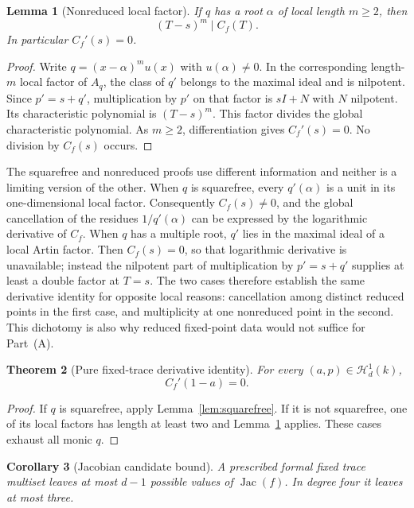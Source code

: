 \documentclass[11pt]{article}
\newtheorem{theorem}{Theorem}[section]
\newtheorem{lemma}[theorem]{Lemma}
\newtheorem{corollary}[theorem]{Corollary}
\theoremstyle{definition}
\newcommand{\Hn}{\mathcal H}
\newcommand{\Jac}{\operatorname{Jac}}
\begin{document}
\begin{lemma}[Nonreduced local factor]
\label{lem:nonreduced}
If $q$ has a root $\alpha$ of local length $m\ge2$, then
\[
(T-s)^m\mid C_f(T).
\]
In particular $C_f'(s)=0$.
\end{lemma}

\begin{proof}
Write $q=(x-\alpha)^m u(x)$ with $u(\alpha)\ne0$. In the corresponding length-$m$ local factor of $A_q$, the class of $q'$ belongs to the maximal ideal and is nilpotent. Since $p'=s+q'$, multiplication by $p'$ on that factor is $sI+N$ with $N$ nilpotent. Its characteristic polynomial is $(T-s)^m$. This factor divides the global characteristic polynomial. As $m\ge2$, differentiation gives $C_f'(s)=0$. No division by $C_f(s)$ occurs.
\end{proof}

The squarefree and nonreduced proofs use different information and neither is a limiting version of the other. When $q$ is squarefree, every $q'(\alpha)$ is a unit in its one-dimensional local factor. Consequently $C_f(s)\ne0$, and the global cancellation of the residues $1/q'(\alpha)$ can be expressed by the logarithmic derivative of $C_f$. When $q$ has a multiple root, $q'$ lies in the maximal ideal of a local Artin factor. Then $C_f(s)=0$, so that logarithmic derivative is unavailable; instead the nilpotent part of multiplication by $p'=s+q'$ supplies at least a double factor at $T=s$. The two cases therefore establish the same derivative identity for opposite local reasons: cancellation among distinct reduced points in the first case, and multiplicity at one nonreduced point in the second. This dichotomy is also why reduced fixed-point data would not suffice for Part~\textnormal{(A)}.

\begin{theorem}[Pure fixed-trace derivative identity]
\label{thm:derivative-identity}
For every $(a,p)\in\Hn^1_d(k)$,
\[
C_f'(1-a)=0.
\]
\end{theorem}

\begin{proof}
If $q$ is squarefree, apply Lemma~\ref{lem:squarefree}. If it is not squarefree, one of its local factors has length at least two and Lemma~\ref{lem:nonreduced} applies. These cases exhaust all monic $q$.
\end{proof}

\begin{corollary}[Jacobian candidate bound]
\label{cor:jacobian-bound}
A prescribed formal fixed trace multiset leaves at most $d-1$ possible values of $\Jac(f)$. In degree four it leaves at most three.
\end{corollary}
\end{document}
